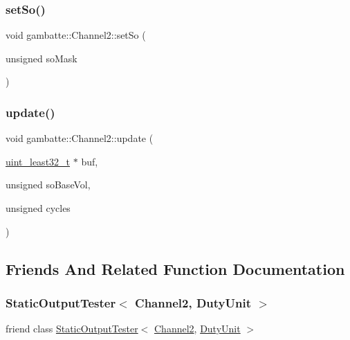 \subsubsection{\texorpdfstring{set\+So()}{setSo()}}
{\footnotesize\ttfamily void gambatte\+::\+Channel2\+::set\+So (\begin{DoxyParamCaption}\item[{unsigned}]{so\+Mask }\end{DoxyParamCaption})}

\mbox{\label{classgambatte_1_1Channel2_a017f34d58c36f89f8b3f64a552e3b31e}} 
\subsubsection{\texorpdfstring{update()}{update()}}
{\footnotesize\ttfamily void gambatte\+::\+Channel2\+::update (\begin{DoxyParamCaption}\item[{\hyperlink{namespacegambatte_a0639f09fccfbbd5a8e0796318768e370}{uint\+\_\+least32\+\_\+t} $\ast$}]{buf,  }\item[{unsigned}]{so\+Base\+Vol,  }\item[{unsigned}]{cycles }\end{DoxyParamCaption})}



\subsection{Friends And Related Function Documentation}
\mbox{\label{classgambatte_1_1Channel2_a0e4bb4e43d3269e56a11539381699ad0}} 
\subsubsection{\texorpdfstring{Static\+Output\+Tester$<$ Channel2, Duty\+Unit $>$}{StaticOutputTester< Channel2, DutyUnit >}}
{\footnotesize\ttfamily friend class \hyperlink{classgambatte_1_1StaticOutputTester}{Static\+Output\+Tester}$<$ \hyperlink{classgambatte_1_1Channel2}{Channel2}, \hyperlink{classgambatte_1_1DutyUnit}{Duty\+Unit} $>$\hspace{0.3cm}{\ttfamily [friend]}}



